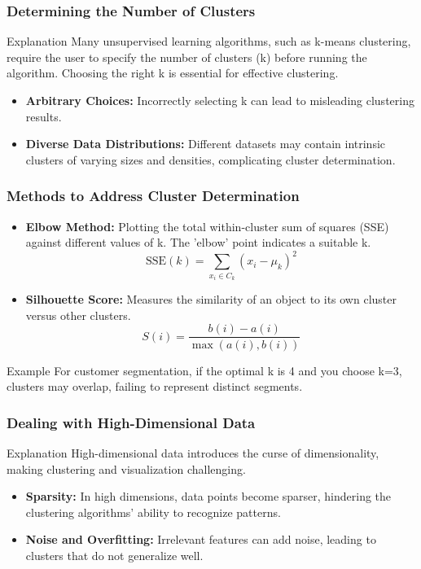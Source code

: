 \documentclass[aspectratio=169]{beamer}
\begin{document}
\begin{frame}[fragile]
    \frametitle{Determining the Number of Clusters}
    \begin{block}{Explanation}
        Many unsupervised learning algorithms, such as k-means clustering, require the user to specify the number of clusters (k) before running the algorithm. Choosing the right k is essential for effective clustering.
    \end{block}
    \begin{itemize}
        \item \textbf{Arbitrary Choices:} Incorrectly selecting k can lead to misleading clustering results.
        \item \textbf{Diverse Data Distributions:} Different datasets may contain intrinsic clusters of varying sizes and densities, complicating cluster determination.
    \end{itemize}
\end{frame}

\begin{frame}[fragile]
    \frametitle{Methods to Address Cluster Determination}
    \begin{itemize}
        \item \textbf{Elbow Method:} Plotting the total within-cluster sum of squares (SSE) against different values of k. The 'elbow' point indicates a suitable k.
        \begin{equation}
            \text{SSE}(k) = \sum_{x_i \in C_k} (x_i - \mu_k)^2
        \end{equation}

        \item \textbf{Silhouette Score:} Measures the similarity of an object to its own cluster versus other clusters.
        \begin{equation}
            S(i) = \frac{b(i) - a(i)}{\max(a(i), b(i))}
        \end{equation}
    \end{itemize}
    \begin{block}{Example}
        For customer segmentation, if the optimal k is 4 and you choose k=3, clusters may overlap, failing to represent distinct segments.
    \end{block}
\end{frame}

\begin{frame}[fragile]
    \frametitle{Dealing with High-Dimensional Data}
    \begin{block}{Explanation}
        High-dimensional data introduces the curse of dimensionality, making clustering and visualization challenging.
    \end{block}
    \begin{itemize}
        \item \textbf{Sparsity:} In high dimensions, data points become sparser, hindering the clustering algorithms' ability to recognize patterns.
        \item \textbf{Noise and Overfitting:} Irrelevant features can add noise, leading to clusters that do not generalize well.
    \end{itemize}
\end{frame}
\end{document}
